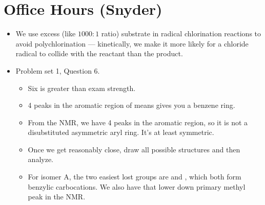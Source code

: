 \documentclass[../notes.tex]{subfiles}
\begin{document}
\section{Office Hours (Snyder)}
\begin{itemize}
    \item {}We use excess (like $1000:1$ ratio) substrate in radical chlorination reactions to avoid polychlorination --- kinetically, we make it more likely for a chloride radical to collide with the reactant than the product.
    \item Problem set 1, Question 6.
    \begin{itemize}
        \item Six is greater than exam strength.
        \item 4 peaks in the aromatic region of  means gives you a benzene ring.
        \item From the  NMR, we have 4 peaks in the aromatic region, so it is not a disubstituted asymmetric aryl ring. It's at least symmetric.
        \item Once we get reasonably close, draw all possible structures and then analyze.
        \item For isomer A, the two easiest lost groups are  and , which both form benzylic carbocations. We also have that lower down primary methyl peak in the  NMR.
    \end{itemize}
\end{itemize}
\end{document}
